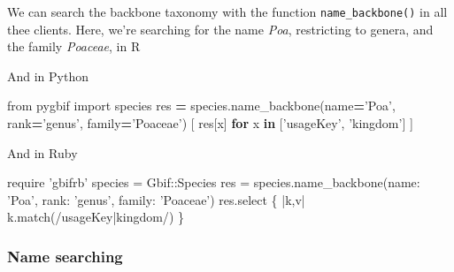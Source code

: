 \documentclass[author-year, review, 11pt]{components/elsarticle} %
\newenvironment{Shaded}{\begin{snugshade}}{\end{snugshade}}
\newcommand{\KeywordTok}[1]{\textcolor[rgb]{0.13,0.29,0.53}{\textbf{#1}}}
\newcommand{\DataTypeTok}[1]{\textcolor[rgb]{0.13,0.29,0.53}{#1}}
\newcommand{\StringTok}[1]{\textcolor[rgb]{0.31,0.60,0.02}{#1}}
\newcommand{\ImportTok}[1]{#1}
\newcommand{\CommentTok}[1]{\textcolor[rgb]{0.56,0.35,0.01}{\textit{#1}}}
\newcommand{\OtherTok}[1]{\textcolor[rgb]{0.56,0.35,0.01}{#1}}
\newcommand{\ControlFlowTok}[1]{\textcolor[rgb]{0.13,0.29,0.53}{\textbf{#1}}}
\newcommand{\OperatorTok}[1]{\textcolor[rgb]{0.81,0.36,0.00}{\textbf{#1}}}
\newcommand{\NormalTok}[1]{#1}
\begin{document}
We can search the backbone taxonomy with the function
\texttt{name\_backbone()} in all thee clients. Here, we're searching for
the name \emph{Poa}, restricting to genera, and the family
\emph{Poaceae}, in R

\begin{Shaded}
\end{Shaded}

And in Python

\begin{Shaded}
\begin{Highlighting}[]
\ImportTok{from}\NormalTok{ pygbif }\ImportTok{import}\NormalTok{ species}
\NormalTok{res }\OperatorTok{=}\NormalTok{ species.name_backbone(name}\OperatorTok{=}\StringTok{'Poa'}\NormalTok{, rank}\OperatorTok{=}\StringTok{'genus'}\NormalTok{, family}\OperatorTok{=}\StringTok{'Poaceae'}\NormalTok{)}
\NormalTok{[ res[x] }\ControlFlowTok{for}\NormalTok{ x }\KeywordTok{in}\NormalTok{ [}\StringTok{'usageKey'}\NormalTok{, }\StringTok{'kingdom'}\NormalTok{] ]}
\end{Highlighting}
\end{Shaded}

And in Ruby

\begin{Shaded}
\begin{Highlighting}[]
\NormalTok{require }\StringTok{'gbifrb'}
\NormalTok{species = }\DataTypeTok{Gbif}\NormalTok{::}\DataTypeTok{Species}
\NormalTok{res = species.name_backbone(}\StringTok{name: 'Poa'}\NormalTok{, }\StringTok{rank: 'genus'}\NormalTok{, }\StringTok{family: 'Poaceae'}\NormalTok{)}
\NormalTok{res.select \{ |k,v| k.match(}\OtherTok{/usageKey|kingdom/}\NormalTok{) \}}
\end{Highlighting}
\end{Shaded}

\subsubsection{Name searching}\label{name-searching}
\end{document}
